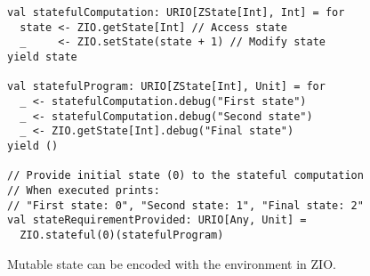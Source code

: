 \begin{algorithm}

\begin{verbatim}
val statefulComputation: URIO[ZState[Int], Int] = for
  state <- ZIO.getState[Int] // Access state
  _     <- ZIO.setState(state + 1) // Modify state
yield state

val statefulProgram: URIO[ZState[Int], Unit] = for
  _ <- statefulComputation.debug("First state")
  _ <- statefulComputation.debug("Second state")
  _ <- ZIO.getState[Int].debug("Final state")
yield ()

// Provide initial state (0) to the stateful computation
// When executed prints:
// "First state: 0", "Second state: 1", "Final state: 2"
val stateRequirementProvided: URIO[Any, Unit] =
  ZIO.stateful(0)(statefulProgram)
\end{verbatim}

\caption{Mutable state can be encoded with the environment in ZIO. \label{zio:state}}
\end{algorithm}